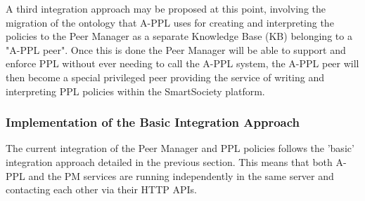 A third integration approach may be proposed at this point, involving the migration of the ontology that A-PPL uses for creating and interpreting the policies to the Peer Manager as a separate Knowledge Base (KB) belonging to a "A-PPL peer". Once this is done the Peer Manager will be able to support and enforce PPL without ever needing to call the A-PPL system, the A-PPL peer will then become a special privileged peer providing the service of writing and interpreting PPL policies within the SmartSociety platform. 

\subsubsection{Implementation of the Basic Integration Approach}
The current integration of the Peer Manager and PPL policies follows the 'basic' integration approach detailed in the previous section. This means that both A-PPL and the PM services are running independently in the same server and contacting each other via their HTTP APIs.

